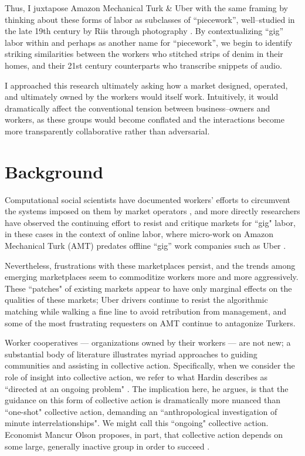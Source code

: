\documentclass{sigchi-ext}
\begin{document}
Thus, I juxtapose Amazon Mechanical Turk \& Uber with the same framing by
thinking about these forms of labor as subclasses of ``piecework'',
well--studied in the late 19th century by Riis through photography
\cite{riis2004other}.
By contextualizing ``gig'' labor within and perhaps as another name for ``piecework'',
we begin to identify striking similarities between
the workers who stitched strips of denim in their homes, and
their 21st century counterparts who transcribe snippets of audio.

I approached this research ultimately asking how a market
designed, operated, and ultimately owned
by the workers would itself work.
Intuitively, it would dramatically affect the conventional tension between business--owners and workers,
as these groups would become conflated and the interactions become more transparently collaborative rather than adversarial.

\section{Background}
Computational social scientists have documented workers' efforts to circumvent the systems imposed on them by market operators
\cite{uberAlgorithm},
and more directly researchers have observed the continuing effort to resist and critique markets for ``gig" labor, in these cases in the context of online labor, where micro-work on Amazon Mechanical Turk (AMT) predates offline ``gig'' work companies such as Uber
\cite{turkopticon,dynamo}.

Nevertheless, frustrations with these marketplaces persist,
and the trends among emerging marketplaces seem to commoditize workers more and more aggressively.
These ``patches" of existing markets appear to have only marginal effects on the qualities of these markets;
Uber drivers continue to resist the algorithmic matching while walking a fine line to avoid retribution from management, and some of the most frustrating requesters on AMT continue to antagonize Turkers.


Worker cooperatives
--- organizations owned by their workers ---
are not new;
a substantial body of literature illustrates myriad approaches to guiding communities and assisting in collective action.
Specifically, when we consider the role of insight into collective action, we refer to what Hardin describes as ``directed at an ongoing problem"
\cite{russell1982collective}.
The implication here, he argues, is that the guidance on this form of collective action is dramatically more nuanced than ``one-shot" collective action, demanding an ``anthropological investigation of minute interrelationships".
We might call this ``ongoing" collective action.
Economist Mancur Olson proposes, in part, that collective action depends on some large, generally inactive group in order to succeed
\cite{olsonlogic}.
\end{document}
